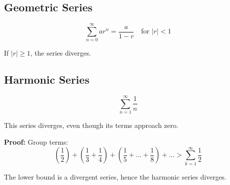 \subsection{Geometric Series}

\[
\sum_{n=0}^\infty ar^n = \frac{a}{1 - r} \quad \text{for } |r| < 1
\]

If \(|r| \ge 1\), the series diverges.

\subsection{Harmonic Series}

\[
\sum_{n=1}^{\infty} \frac{1}{n}
\]

This series diverges, even though its terms approach zero.

\textbf{Proof:} Group terms:
\[
\left(\frac{1}{2}\right) + \left(\frac{1}{3} + \frac{1}{4}\right) + \left(\frac{1}{5} + \dots + \frac{1}{8}\right) + \dots > \sum_{k=1}^\infty \frac{1}{2}
\]

The lower bound is a divergent series, hence the harmonic series diverges.

